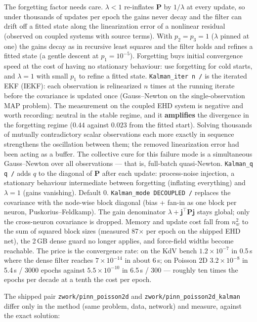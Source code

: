 \documentclass[10pt,a4paper]{article}
\newcommand{\code}[1]{\texttt{#1}}
\newcommand{\mi}[1]{\boldsymbol{#1}}
\begin{document}
The forgetting factor needs care. $\lambda<1$ re-inflates $\mi{P}$ by
$1/\lambda$ at every update, so under thousands of updates per epoch
the gains never decay and the filter can drift off a fitted state
along the linearization error of a nonlinear residual (observed on
coupled systems with source terms). With $p_2=p_3=1$ ($\lambda$
pinned at one) the gains decay as in recursive least squares and the
filter holds and refines a fitted state (a gentle descent at
$p_1=10^{-5}$). Forgetting buys initial convergence speed at the cost
of having no stationary behaviour: use forgetting for cold starts,
and $\lambda=1$ with small $p_1$ to refine a fitted state.
\code{Kalman\_iter n /} is the iterated EKF (IEKF): each observation
is relinearized $n$ times at the running iterate before the
covariance is updated once (Gauss--Newton on the single-observation
MAP problem). The measurement on the coupled EHD system is negative
and worth recording: neutral in the stable regime, and it
\textbf{amplifies} the divergence in the forgetting regime ($0.44$
against $0.023$ from the fitted start). Solving thousands of mutually
contradictory scalar observations each more exactly in sequence
strengthens the oscillation between them; the removed linearization
error had been acting as a buffer. The collective cure for this
failure mode is a simultaneous Gauss--Newton over all observations
--- that is, full-batch quasi-Newton.
\code{Kalman\_q q /} adds $q$ to the diagonal of $\mi{P}$ after each
update: process-noise injection, a stationary behaviour intermediate
between forgetting (inflating everything) and $\lambda=1$ (gains
vanishing). Default 0.
\code{Kalman\_mode DECOUPLED /} replaces the covariance with the
node-wise block diagonal (bias + fan-in as one block per neuron,
Puskorius--Feldkamp). The gain denominator
$\lambda+\mi{j}^{\top}\mi{P}\mi{j}$ stays global; only the
cross-neuron covariance is dropped. Memory and update cost fall from
$n_w^2$ to the sum of squared block sizes (measured 87$\times$ per
epoch on the shipped EHD net), the 2\,GB dense guard no longer
applies, and force-field widths become reachable. The price is the
convergence rate: on the KdV bench $1.2\times10^{-7}$ in 0.5\,s where
the dense filter reaches $7\times10^{-14}$ in about 6\,s; on Poisson
2D $3.2\times10^{-8}$ in 5.4\,s / 3000 epochs against
$5.5\times10^{-10}$ in 6.5\,s / 300 --- roughly ten times the epochs
per decade at a tenth the cost per epoch.

The shipped pair \code{zwork/pinn\_poisson2d} and
\code{zwork/pinn\_poisson2d\_kalman} differ only in the method (same
problem, data, network) and measure, against the exact solution:
\end{document}
